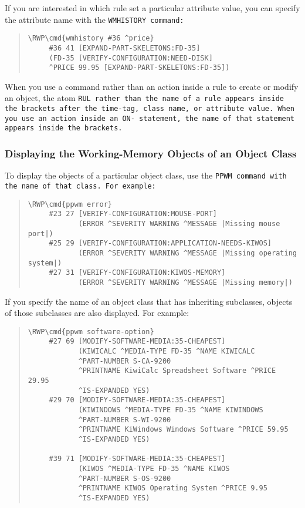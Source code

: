 If you are interested in which rule set a particular attribute value,
you can specify the attribute name with the \tt{WMHISTORY} command:
\begin{quote}
\begin{Verbatim}[commandchars=\\\{\}]
\RWP\cmd{wmhistory #36 ^price}
     #36 41 [EXPAND-PART-SKELETONS:FD-35]
     (FD-35 [VERIFY-CONFIGURATION:NEED-DISK]
     ^PRICE 99.95 [EXPAND-PART-SKELETONS:FD-35])
\end{Verbatim}
\end{quote}

When you use a command rather than an action inside a rule to create
or modify an object, the atom \tt{RUL} rather than the name of a rule
appears inside the brackets after the time-tag, class name, or
attribute value. When you use an action inside an \tt{ON-} statement,
the name of that statement appears inside the brackets.

\subsubsection{Displaying the Working-Memory Objects of an Object
  Class}

To display the objects of a particular object class, use the \tt{PPWM}
command with the name of that class. For example:

\begin{quote}
\begin{Verbatim}[commandchars=\\\{\}]
\RWP\cmd{ppwm error}
     #23 27 [VERIFY-CONFIGURATION:MOUSE-PORT]
            (ERROR ^SEVERITY WARNING ^MESSAGE |Missing mouse port|)
     #25 29 [VERIFY-CONFIGURATION:APPLICATION-NEEDS-KIWOS]
            (ERROR ^SEVERITY WARNING ^MESSAGE |Missing operating system|)
     #27 31 [VERIFY-CONFIGURATION:KIWOS-MEMORY]
            (ERROR ^SEVERITY WARNING ^MESSAGE |Missing memory|)
\end{Verbatim}
\end{quote}

If you specify the name of an object class that has inheriting
subclasses, objects of those subclasses are also displayed. For
example:

\begin{quote}
\begin{Verbatim}[commandchars=\\\{\}]
\RWP\cmd{ppwm software-option}
     #27 69 [MODIFY-SOFTWARE-MEDIA:35-CHEAPEST]
            (KIWICALC ^MEDIA-TYPE FD-35 ^NAME KIWICALC
            ^PART-NUMBER S-CA-9200
            ^PRINTNAME KiwiCalc Spreadsheet Software ^PRICE 29.95
            ^IS-EXPANDED YES)
     #29 70 [MODIFY-SOFTWARE-MEDIA:35-CHEAPEST]
            (KIWINDOWS ^MEDIA-TYPE FD-35 ^NAME KIWINDOWS
            ^PART-NUMBER S-WI-9200
            ^PRINTNAME KiWindows Windows Software ^PRICE 59.95
            ^IS-EXPANDED YES)

     #39 71 [MODIFY-SOFTWARE-MEDIA:35-CHEAPEST]
            (KIWOS ^MEDIA-TYPE FD-35 ^NAME KIWOS 
            ^PART-NUMBER S-OS-9200
            ^PRINTNAME KIWOS Operating System ^PRICE 9.95 
            ^IS-EXPANDED YES)
\end{Verbatim}
\end{quote}

